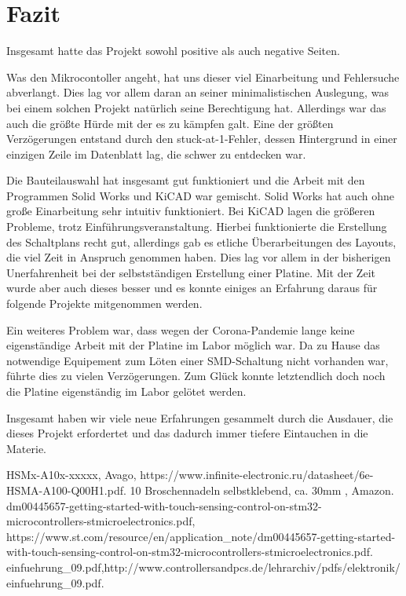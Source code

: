 \documentclass[a4paper,
DIV=13,
12pt,
BCOR=10mm,
department=FakEI,
parskip=half,
automark,
]{article}
\begin{document}
\section{Fazit}

Insgesamt hatte das Projekt sowohl positive als auch negative Seiten.

Was den Mikrocontoller angeht, hat uns dieser viel Einarbeitung und Fehlersuche abverlangt. Dies lag vor allem daran an seiner minimalistischen Auslegung, was bei einem solchen Projekt natürlich seine Berechtigung hat. Allerdings war das auch die größte Hürde mit der es zu kämpfen galt. Eine der größten Verzögerungen entstand durch den stuck-at-1-Fehler, dessen Hintergrund in einer einzigen Zeile im Datenblatt lag, die schwer zu entdecken war.

Die Bauteilauswahl hat insgesamt gut funktioniert und die Arbeit mit den Programmen Solid Works und KiCAD war gemischt. Solid Works hat auch ohne große Einarbeitung sehr intuitiv funktioniert. Bei KiCAD lagen die größeren Probleme, trotz Einführungsveranstaltung. Hierbei funktionierte die Erstellung des Schaltplans recht gut, allerdings gab es etliche Überarbeitungen des Layouts, die viel Zeit in Anspruch genommen haben. Dies lag vor allem in der bisherigen Unerfahrenheit bei der selbstständigen Erstellung einer Platine. Mit der Zeit wurde aber auch dieses besser und es konnte einiges an Erfahrung daraus für folgende Projekte mitgenommen werden. 

Ein weiteres Problem war, dass wegen der Corona-Pandemie lange keine eigenständige Arbeit mit der Platine im Labor möglich war. Da zu Hause das notwendige Equipement zum Löten einer SMD-Schaltung nicht vorhanden war, führte dies zu vielen Verzögerungen. Zum Glück konnte letztendlich doch noch die Platine eigenständig im Labor gelötet werden.

Insgesamt haben wir viele neue Erfahrungen gesammelt durch die Ausdauer, die dieses Projekt erfordertet und das dadurch immer tiefere Eintauchen in die Materie. 






\cleardoublepage
\begin{appendix}
\listoffigures
\listoftables

\cleardoublepage
\begin{thebibliography}{99}
 HSMx-A10x-xxxxx, Avago, https://www.infinite-electronic.ru/datasheet/6e-HSMA-A100-Q00H1.pdf.
 10 Broschennadeln selbstklebend, ca. 30mm , Amazon.
 dm00445657-getting-started-with-touch-sensing-control-on-stm32-microcontrollers-stmicroelectronics.pdf, https://www.st.com/resource/en/application_note/dm00445657-getting-started-with-touch-sensing-control-on-stm32-microcontrollers-stmicroelectronics.pdf.
 einfuehrung_09.pdf,http://www.controllersandpcs.de/lehrarchiv/pdfs/elektronik/einfuehrung_09.pdf.
\end{thebibliography}

\cleardoublepage

\end{appendix}
\end{document}
